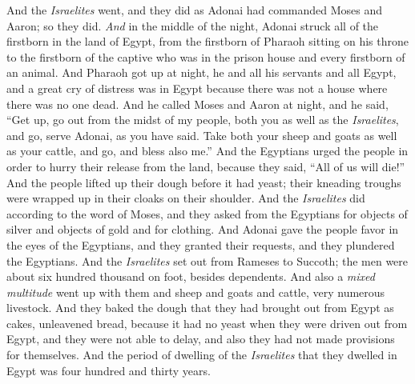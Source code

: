 \begin{biblechapter}
\verse And the \textit{Israelites} went, and they did as Adonai had commanded Moses and Aaron; so they did.
 \textit{And} in the middle of the night, Adonai struck all of the firstborn in the land of Egypt, from the firstborn of Pharaoh sitting on his throne to the firstborn of the captive who was in the prison house and every firstborn of an animal.
\verse And Pharaoh got up at night, he and all his servants and all Egypt, and a great cry of distress was in Egypt because there was not a house where there was no one dead.
\verse And he called Moses and Aaron at night, and he said, “Get up, go out from the midst of my people, both you as well as the \textit{Israelites}, and go, serve Adonai, as you have said.
\verse Take both your sheep and goats as well as your cattle, and go, and bless also me.”
\verse And the Egyptians urged the people in order to hurry their release from the land, because they said, “All of us will die!”
\verse And the people lifted up their dough before it had yeast; their kneading troughs were wrapped up in their cloaks on their shoulder.
\verse And the \textit{Israelites} did according to the word of Moses, and they asked from the Egyptians for objects of silver and objects of gold and for clothing.
\verse And Adonai gave the people favor in the eyes of the Egyptians, and they granted their requests, and they plundered the Egyptians.
\verse And the \textit{Israelites} set out from Rameses to Succoth; the men were about six hundred thousand on foot, besides dependents.
\verse And also a \textit{mixed multitude} went up with them and sheep and goats and cattle, very numerous livestock.
\verse And they baked the dough that they had brought out from Egypt as cakes, unleavened bread, because it had no yeast when they were driven out from Egypt, and they were not able to delay, and also they had not made provisions for themselves.
\verse And the period of dwelling of the \textit{Israelites} that they dwelled in Egypt was four hundred and thirty years.

\end{biblechapter}
